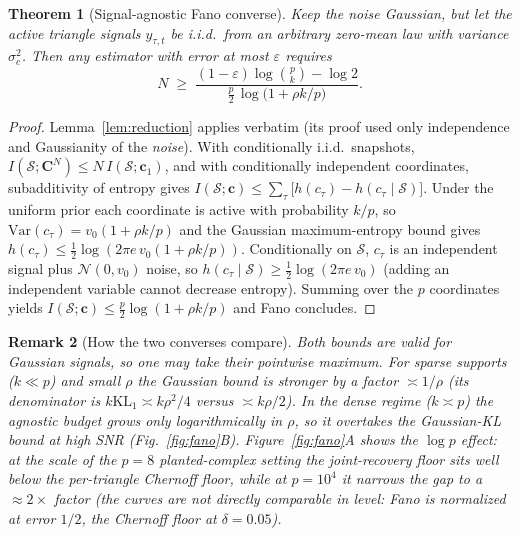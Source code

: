 \documentclass[11pt]{article}
\newtheorem{theorem}{Theorem}[section]
\newtheorem{remark}[theorem]{Remark}
\newcommand{\Scal}{\mathcal{S}}
\newcommand{\KL}{\mathrm{KL}}
\begin{document}
\begin{theorem}[Signal-agnostic Fano converse]\label{thm:fano-agnostic}
Keep the noise Gaussian, but let the active triangle signals
$y_{\tau,t}$ be i.i.d.\ from an \emph{arbitrary} zero-mean law with variance
$\sigma_c^2$. Then any estimator with error at most $\varepsilon$ requires
\begin{equation}\label{eq:fano-agn}
N \;\ge\; \frac{(1-\varepsilon)\log\binom pk-\log 2}
{\tfrac p2\,\log\!\bigl(1+\rho k/p\bigr)} .
\end{equation}
\end{theorem}
\begin{proof}
Lemma~\ref{lem:reduction} applies verbatim (its proof used only independence
and Gaussianity of the \emph{noise}). With conditionally i.i.d.\ snapshots,
$I(\Scal;\bm C^N)\le N\,I(\Scal;\bm c_1)$, and with conditionally independent
coordinates, subadditivity of entropy gives
$I(\Scal;\bm c)\le\sum_{\tau}\bigl[h(c_\tau)-h(c_\tau\mid\Scal)\bigr]$.
Under the uniform prior each coordinate is active with probability $k/p$, so
$\mathrm{Var}(c_\tau)=v_0(1+\rho k/p)$ and the Gaussian maximum-entropy bound
gives $h(c_\tau)\le\frac12\log(2\pi e\,v_0(1+\rho k/p))$. Conditionally on
$\Scal$, $c_\tau$ is an independent signal plus $\mathcal N(0,v_0)$ noise, so
$h(c_\tau\mid\Scal)\ge\frac12\log(2\pi e\,v_0)$ (adding an independent
variable cannot decrease entropy). Summing over the $p$ coordinates yields
$I(\Scal;\bm c)\le\frac p2\log(1+\rho k/p)$ and Fano concludes.
\end{proof}

\begin{remark}[How the two converses compare]
Both bounds are valid for Gaussian signals, so one may take their pointwise
maximum. For sparse supports ($k\ll p$) and small $\rho$ the Gaussian bound is
stronger by a factor $\asymp 1/\rho$ (its denominator is
$k\KL_1\asymp k\rho^2/4$ versus $\asymp k\rho/2$). In the dense regime
($k\asymp p$) the agnostic budget grows only logarithmically in $\rho$, so it
\emph{overtakes} the Gaussian-KL bound at high SNR
(Fig.~\ref{fig:fano}B). Figure~\ref{fig:fano}A shows the $\log p$ effect: at
the scale of the $p=8$ planted-complex setting the joint-recovery floor sits well
below the per-triangle Chernoff floor, while at $p=10^4$ it narrows the gap
to a $\approx 2\times$ factor (the curves are not directly comparable in
level: Fano is normalized at error $1/2$, the Chernoff floor at
$\delta=0.05$).
\end{remark}
\end{document}
